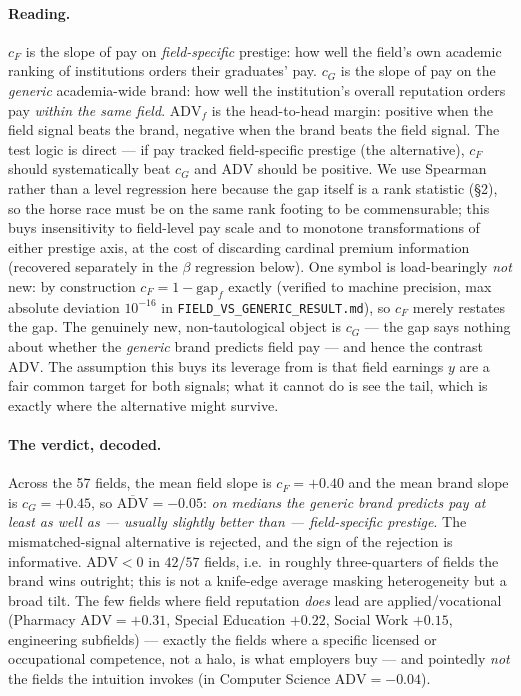 \documentclass[11pt]{article}
\begin{document}
\paragraph{Reading.} $c_F$ is the slope of pay on \emph{field-specific} prestige: how well the field's own academic ranking of institutions orders their graduates' pay. $c_G$ is the slope of pay on the \emph{generic} academia-wide brand: how well the institution's overall reputation orders pay \emph{within the same field}. $\mathrm{ADV}_f$ is the head-to-head margin: positive when the field signal beats the brand, negative when the brand beats the field signal. The test logic is direct --- if pay tracked field-specific prestige (the alternative), $c_F$ should systematically beat $c_G$ and $\mathrm{ADV}$ should be positive. We use Spearman rather than a level regression here because the gap itself is a rank statistic (\S2), so the horse race must be on the same rank footing to be commensurable; this buys insensitivity to field-level pay scale and to monotone transformations of either prestige axis, at the cost of discarding cardinal premium information (recovered separately in the $\beta$ regression below). One symbol is load-bearingly \emph{not} new: by construction $c_F = 1 - \mathrm{gap}_f$ exactly (verified to machine precision, max absolute deviation $10^{-16}$ in \texttt{FIELD\_VS\_GENERIC\_RESULT.md}), so $c_F$ merely restates the gap. The genuinely new, non-tautological object is $c_G$ --- the gap says nothing about whether the \emph{generic} brand predicts field pay --- and hence the contrast $\mathrm{ADV}$. The assumption this buys its leverage from is that field earnings $y$ are a fair common target for both signals; what it cannot do is see the tail, which is exactly where the alternative might survive.

\paragraph{The verdict, decoded.} Across the 57 fields, the mean field slope is $c_F = +0.40$ and the mean brand slope is $c_G = +0.45$, so $\overline{\mathrm{ADV}} = -0.05$: \emph{on medians the generic brand predicts pay at least as well as --- usually slightly better than --- field-specific prestige}. The mismatched-signal alternative is rejected, and the sign of the rejection is informative. $\mathrm{ADV} < 0$ in $42/57$ fields, i.e.\ in roughly three-quarters of fields the brand wins outright; this is not a knife-edge average masking heterogeneity but a broad tilt. The few fields where field reputation \emph{does} lead are applied/vocational (Pharmacy $\mathrm{ADV}=+0.31$, Special Education $+0.22$, Social Work $+0.15$, engineering subfields) --- exactly the fields where a specific licensed or occupational competence, not a halo, is what employers buy --- and pointedly \emph{not} the fields the intuition invokes (in Computer Science $\mathrm{ADV}=-0.04$).
\end{document}
